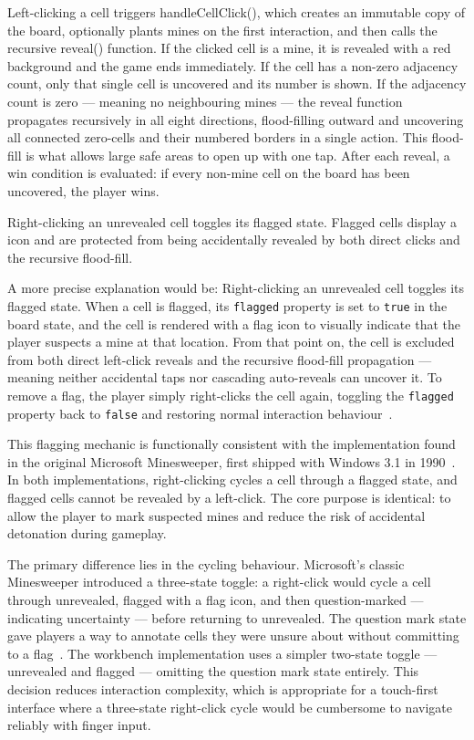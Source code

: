 \documentclass[a4paper,12pt]{article}
\begin{document}
Left-clicking a cell triggers handleCellClick(), which creates an immutable copy of the board, optionally plants mines on the first interaction, and then calls the recursive reveal() function. If the clicked cell is a mine, it is revealed with a red background and the game ends immediately. If the cell has a non-zero adjacency count, only that single cell is uncovered and its number is shown. If the adjacency count is zero — meaning no neighbouring mines — the reveal function propagates recursively in all eight directions, flood-filling outward and uncovering all connected zero-cells and their numbered borders in a single action. This flood-fill is what allows large safe areas to open up with one tap. After each reveal, a win condition is evaluated: if every non-mine cell on the board has been uncovered, the player wins.

\newpage
Right-clicking an unrevealed cell toggles its flagged state. Flagged cells display a icon and are protected from being accidentally revealed by both direct clicks and the recursive flood-fill. 

\begin{notebox}
A more precise explanation would be: 
Right-clicking an unrevealed cell toggles its flagged state. When a cell 
is flagged, its \texttt{flagged} property is set to \texttt{true} in the 
board state, and the cell is rendered with a flag icon to visually indicate 
that the player suspects a mine at that location. From that point on, the 
cell is excluded from both direct left-click reveals and the recursive 
flood-fill propagation — meaning neither accidental taps nor cascading 
auto-reveals can uncover it. To remove a flag, the player simply 
right-clicks the cell again, toggling the \texttt{flagged} property back 
to \texttt{false} and restoring normal interaction behaviour~\cite{minesweeper_mechanics}.

This flagging mechanic is functionally consistent with the implementation 
found in the original Microsoft Minesweeper, first shipped with Windows 3.1 
in 1990~\cite{minesweeper_history}. In both implementations, right-clicking 
cycles a cell through a flagged state, and flagged cells cannot be revealed 
by a left-click. The core purpose is identical: to allow the player to mark 
suspected mines and reduce the risk of accidental detonation during gameplay.

The primary difference lies in the cycling behaviour. Microsoft's classic 
Minesweeper introduced a three-state toggle: a right-click would cycle a 
cell through unrevealed, flagged with a flag icon, and then question-marked 
— indicating uncertainty — before returning to unrevealed. The question mark 
state gave players a way to annotate cells they were unsure about without 
committing to a flag~\cite{minesweeper_mechanics}. The workbench 
implementation uses a simpler two-state toggle — unrevealed and flagged — 
omitting the question mark state entirely. This decision reduces interaction 
complexity, which is appropriate for a touch-first interface where a 
three-state right-click cycle would be cumbersome to navigate reliably 
with finger input.
\end{notebox}
\end{document}
